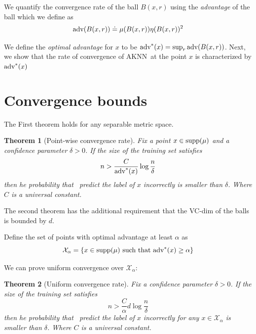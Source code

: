 \documentclass{article}
\def\X{{\mathcal X}}
\def\supp{{\rm supp}}
\newcommand{\algname}{\textsc{AKNN}}
\newtheorem{theorem}{Theorem}
\begin{document}
We quantify the convergence rate of the ball $B(x,r)$ using the
{\em advantage} of the ball which we define as
\begin{equation}
\mbox{adv}(B(x,r)) \doteq \mu(B(x,r)) \eta(B(x,r))^2
\end{equation}

We define the {\em optimal advantage} for $x$ to be $\mbox{adv}^*(x)= \sup_r \mbox{adv}(B(x,r))$. Next, we show that the rate of convergence of \algname\ at the point $x$ is characterized by $\mbox{adv}^*(x)$

\section{Convergence bounds}


The First theorem holds for any separable metric space.
\begin{theorem} [Point-wise convergence rate]
Fix a point $x \in \supp(\mu)$ and a confidence parameter $\delta>0$. If the size of the training set satisfies
$$ n > \frac{C}{\mbox{adv}^*(x)} \log \frac{n}{\delta}$$
then he probability that \ouralg\ predict the label of $x$ incorrectly is smaller than $\delta$. Where $C$ is a universal constant.
\end{theorem}


The second theorem has the additional requirement that the VC-dim of the balls is bounded by $d$.

Define the set of points with optimal advantage at least $\alpha$ as
$$ \X_\alpha = \left\{ x \in \supp(\mu) \mbox{ such that } \opt(x) \geq \alpha \right\} $$

We can prove uniform convergence over $\X_\alpha$:

\begin{theorem} [Uniform convergence rate]
Fix a confidence parameter $\delta>0$. If the size of the training set satisfies
$$ n > \frac{C}{\alpha} d \log \frac{n}{\delta}$$
then he probability that \ouralg\ predict the label of $x$ incorrectly for {\em any} $x \in \X_\alpha$ is smaller than $\delta$. Where $C$ is a universal constant.
\end{theorem}
\end{document}
